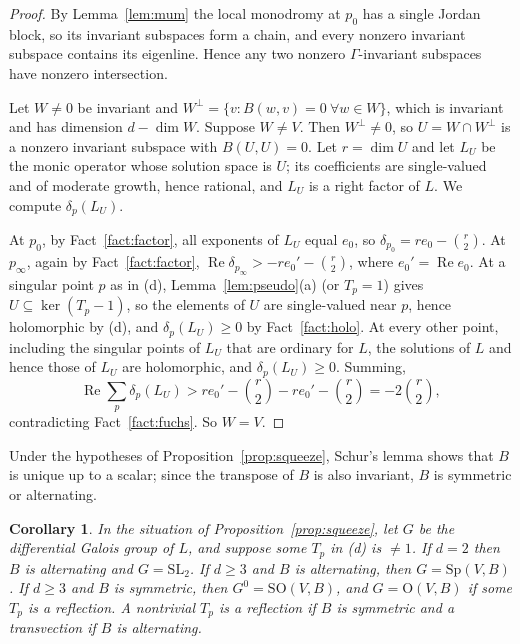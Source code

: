 \documentclass[11pt]{amsart}
\newtheorem{corollary}[thm]{Corollary}
\theoremstyle{definition}
\newcommand{\SL}{\mathrm{SL}}
\newcommand{\Sp}{\mathrm{Sp}}
\newcommand{\SO}{\mathrm{SO}}
\newcommand{\Ort}{\mathrm{O}}
\begin{document}
\begin{proof}
By Lemma~\ref{lem:mum} the local monodromy at $p_0$ has a single Jordan block, so its invariant subspaces form a chain, and every nonzero invariant subspace contains its eigenline. Hence any two nonzero $\Gamma$-invariant subspaces have nonzero intersection.

Let $W\ne0$ be invariant and $W^\perp=\{v:B(w,v)=0\ \forall w\in W\}$, which is invariant and has dimension $d-\dim W$. Suppose $W\ne V$. Then $W^\perp\ne0$, so $U=W\cap W^\perp$ is a nonzero invariant subspace with $B(U,U)=0$. Let $r=\dim U$ and let $L_U$ be the monic operator whose solution space is $U$; its coefficients are single-valued and of moderate growth, hence rational, and $L_U$ is a right factor of $L$. We compute $\delta_p(L_U)$.

At $p_0$, by Fact~\ref{fact:factor}, all exponents of $L_U$ equal $e_0$, so $\delta_{p_0}=re_0-\binom r2$. At $p_\infty$, again by Fact~\ref{fact:factor}, $\operatorname{Re}\delta_{p_\infty}>-re_0'-\binom r2$, where $e_0'=\operatorname{Re}e_0$. At a singular point $p$ as in (d), Lemma~\ref{lem:pseudo}(a) (or $T_p=1$) gives $U\subseteq\ker(T_p-1)$, so the elements of $U$ are single-valued near $p$, hence holomorphic by (d), and $\delta_p(L_U)\ge0$ by Fact~\ref{fact:holo}. At every other point, including the singular points of $L_U$ that are ordinary for $L$, the solutions of $L$ and hence those of $L_U$ are holomorphic, and $\delta_p(L_U)\ge0$. Summing,
\[
\operatorname{Re}\sum_p\delta_p(L_U)>re_0'-\binom r2-re_0'-\binom r2=-2\binom r2,
\]
contradicting Fact~\ref{fact:fuchs}. So $W=V$.
\end{proof}

Under the hypotheses of Proposition~\ref{prop:squeeze}, Schur's lemma shows that $B$ is unique up to a scalar; since the transpose of $B$ is also invariant, $B$ is symmetric or alternating.

\begin{corollary}\label{cor:galois}
In the situation of Proposition~\ref{prop:squeeze}, let $G$ be the differential Galois group of $L$, and suppose some $T_p$ in \textup{(d)} is $\ne1$. If $d=2$ then $B$ is alternating and $G=\SL_2$. If $d\ge3$ and $B$ is alternating, then $G=\Sp(V,B)$. If $d\ge3$ and $B$ is symmetric, then $G^0=\SO(V,B)$, and $G=\Ort(V,B)$ if some $T_p$ is a reflection. A nontrivial $T_p$ is a reflection if $B$ is symmetric and a transvection if $B$ is alternating.
\end{corollary}
\end{document}
